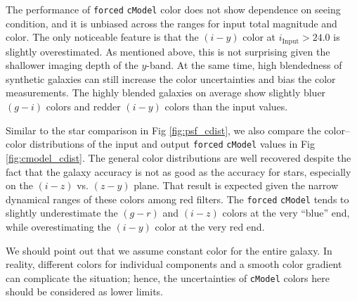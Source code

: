 \documentclass[useamsfonts]{pasj01}
\def\cmodel{\texttt{cModel}}
\def\forced{\texttt{forced}}
\begin{document}
    The performance of \forced{} \cmodel{} color does not show dependence on seeing
    condition, and it is unbiased across the ranges for input total magnitude and color.
    The only noticeable feature is that the $(i-y)$ color at
    $i_{\mathrm{Input}}>24.0$ is slightly overestimated.
    As mentioned above, this is not surprising given the shallower imaging depth of  the
    $y$-band.
    At the same time, high blendedness of synthetic galaxies can still increase the
   color uncertainties and bias the color measurements.
    The highly blended galaxies on average show slightly bluer  $(g-i)$ colors
     and redder  $(i-y)$ colors  than the input values.

    Similar to the star comparison in Fig \ref{fig:psf_cdist}, we also compare the color--color distributions
    of the input and output \forced{} \cmodel{} values in Fig \ref{fig:cmodel_cdist}.
    The general color distributions are well recovered despite the fact that the galaxy accuracy is
    not as good as the accuracy for stars, especially on the $(i-z)$ vs. $(z-y)$ plane.
    That result is expected given the narrow dynamical ranges of these colors among red filters.
    The \forced{} \cmodel{} tends to slightly underestimate the $(g-r)$ and $(i-z)$
    colors at the very ``blue'' end, while overestimating the $(i-y)$ color at the very
    red end.

   We should point out that we assume constant color for the entire galaxy.
    In reality, different colors for individual components and a smooth color gradient
    can complicate the situation; hence, the uncertainties of \cmodel{} colors
    here should be considered as lower limits.
\end{document}
